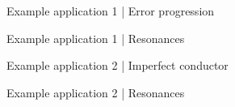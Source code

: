 \documentclass{beamer}
\begin{document}
\begin{frame}{Example application 1 | Error progression}

    \begin{figure}
        \centering
        \scalebox{0.8}{}
    \end{figure}

\end{frame}

\begin{frame}{Example application 1 | Resonances}

    \begin{figure}
        \centering
        \scalebox{0.8}{}
    \end{figure}

\end{frame}

\begin{frame}{Example application 2 | Imperfect conductor}

    \begin{figure}
        \centering
        \scalebox{0.8}{}
    \end{figure}

\end{frame}

\begin{frame}{Example application 2 | Resonances}

    \begin{figure}
        \centering
        \scalebox{0.8}{}
    \end{figure}

\end{frame}
\end{document}
